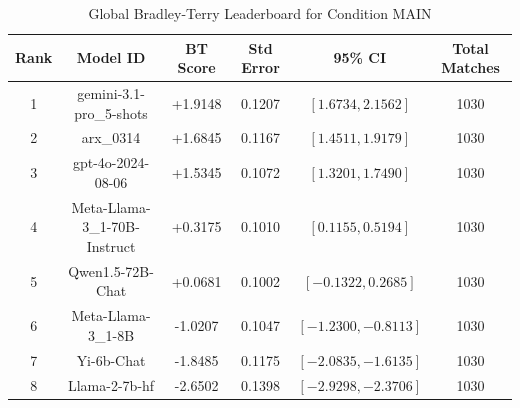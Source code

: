 \begin{table}[ht]
\centering
\caption{Global Bradley-Terry Leaderboard for Condition \textsc{MAIN}}
\label{tab:leaderboard_main}
\begin{tabular}{cccccc}
\hline
\textbf{Rank} & \textbf{Model ID} & \textbf{BT Score} & \textbf{Std Error} & \textbf{95\% CI} & \textbf{Total Matches} \\
\hline
1 & gemini-3.1-pro\_5-shots & +1.9148 & 0.1207 & $[1.6734, 2.1562]$ & 1030 \\
2 & arx\_0314 & +1.6845 & 0.1167 & $[1.4511, 1.9179]$ & 1030 \\
3 & gpt-4o-2024-08-06 & +1.5345 & 0.1072 & $[1.3201, 1.7490]$ & 1030 \\
4 & Meta-Llama-3\_1-70B-Instruct & +0.3175 & 0.1010 & $[0.1155, 0.5194]$ & 1030 \\
5 & Qwen1.5-72B-Chat & +0.0681 & 0.1002 & $[-0.1322, 0.2685]$ & 1030 \\
6 & Meta-Llama-3\_1-8B & -1.0207 & 0.1047 & $[-1.2300, -0.8113]$ & 1030 \\
7 & Yi-6b-Chat & -1.8485 & 0.1175 & $[-2.0835, -1.6135]$ & 1030 \\
8 & Llama-2-7b-hf & -2.6502 & 0.1398 & $[-2.9298, -2.3706]$ & 1030 \\
\hline
\end{tabular}
\end{table}
